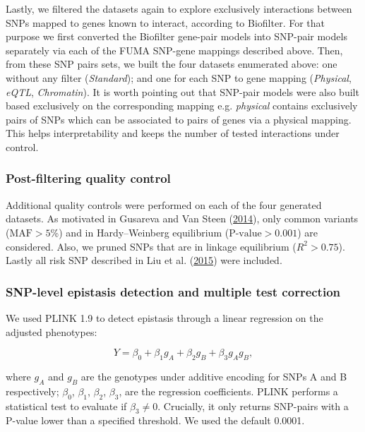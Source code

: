 \documentclass[
  11pt,
]{env/yjiao}
\begin{document}
Lastly, we filtered the datasets again to explore exclusively
interactions between SNPs mapped to genes known to interact, according
to Biofilter. For that purpose we first converted the Biofilter
gene-pair models into SNP-pair models separately via each of the FUMA
SNP-gene mappings described above. Then, from these SNP pairs sets, we
built the four datasets enumerated above: one without any filter (\emph{Standard});
and one for each SNP to gene mapping (\emph{Physical}, \emph{eQTL},
\emph{Chromatin}). It is worth pointing out that SNP-pair models
were also built based exclusively on the corresponding mapping e.g.
\emph{physical} contains exclusively pairs of SNPs which can be associated to
pairs of genes via a physical mapping. This helps interpretability and
keeps the number of tested interactions under control.

\hypertarget{post-filtering-quality-control}{%
\subsubsection{Post-filtering quality control}\label{post-filtering-quality-control}}

Additional quality controls were performed on each of the four generated
datasets. As motivated in Gusareva and Van Steen (\protect\hyperlink{ref-gusareva_practical_2014}{2014}), only common variants
(\(\text{MAF} > 5\)\%) and in Hardy--Weinberg equilibrium (\(\text{P-value} > 0.001\)) are
considered. Also, we pruned SNPs that are in linkage equilibrium
(\(R^{2} > 0.75\)). Lastly all risk SNP described in Liu et al. (\protect\hyperlink{ref-liu2015association}{2015}) were
included.

\hypertarget{methods:snp-epistasis}{%
\subsubsection{SNP-level epistasis detection and multiple test correction}\label{methods:snp-epistasis}}

We used PLINK 1.9 to detect epistasis through a linear regression on the adjusted phenotypes:

\[Y = \beta_0 + \beta_1 g_A + \beta_2 g_B + \beta_3 g_A g_B,\]

where \(g_A\) and \(g_B\) are the genotypes under additive encoding for SNPs
A and B respectively; \(\beta_0\), \(\beta_1\), \(\beta_2\), \(\beta_3\), are
the regression coefficients. PLINK performs a statistical test to
evaluate if \(\beta_3 \neq 0\). Crucially, it only returns SNP-pairs
with a P-value lower than a specified threshold. We used the default
0.0001.
\end{document}

